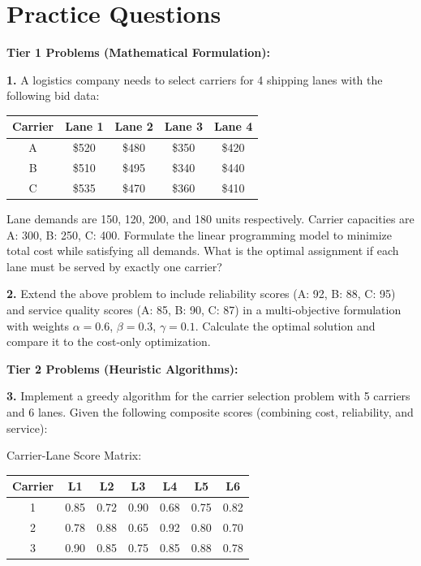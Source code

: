 \documentclass{article}
\begin{document}
\section{Practice Questions}

\textbf{Tier 1 Problems (Mathematical Formulation):}

\textbf{1.} A logistics company needs to select carriers for 4 shipping lanes with the following bid data:

\begin{center}
\begin{tabular}{ccccc}
\toprule
Carrier & Lane 1 & Lane 2 & Lane 3 & Lane 4 \\
\midrule
A & \$520 & \$480 & \$350 & \$420 \\
B & \$510 & \$495 & \$340 & \$440 \\
C & \$535 & \$470 & \$360 & \$410 \\
\bottomrule
\end{tabular}
\end{center}

Lane demands are 150, 120, 200, and 180 units respectively. Carrier capacities are A: 300, B: 250, C: 400. Formulate the linear programming model to minimize total cost while satisfying all demands. What is the optimal assignment if each lane must be served by exactly one carrier?

\textbf{2.} Extend the above problem to include reliability scores (A: 92, B: 88, C: 95) and service quality scores (A: 85, B: 90, C: 87) in a multi-objective formulation with weights $\alpha = 0.6$, $\beta = 0.3$, $\gamma = 0.1$. Calculate the optimal solution and compare it to the cost-only optimization.

\textbf{Tier 2 Problems (Heuristic Algorithms):}

\textbf{3.} Implement a greedy algorithm for the carrier selection problem with 5 carriers and 6 lanes. Given the following composite scores (combining cost, reliability, and service):

Carrier-Lane Score Matrix:
\begin{center}
\begin{tabular}{ccccccc}
\toprule
Carrier & L1 & L2 & L3 & L4 & L5 & L6 \\
\midrule
1 & 0.85 & 0.72 & 0.90 & 0.68 & 0.75 & 0.82 \\
2 & 0.78 & 0.88 & 0.65 & 0.92 & 0.80 & 0.70 \\
3 & 0.90 & 0.85 & 0.75 & 0.85 & 0.88 & 0.78 \\
\bottomrule
\end{tabular}
\end{center}
\end{document}
